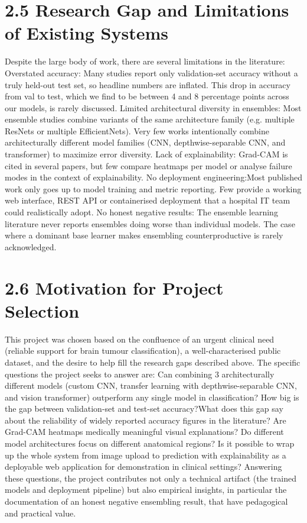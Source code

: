 \documentclass[12pt,a4paper,oneside]{report}
\begin{document}
\section*{2.5 Research Gap and Limitations of Existing Systems}
Despite the large body of work, there are several limitations in the literature:
Overstated accuracy: Many studies report only validation-set accuracy without a truly held-out test set, so headline numbers are inflated. This drop in accuracy from val to test, which we find to be between 4 and 8 percentage points across our models, is rarely discussed.
Limited architectural diversity in ensembles: Most ensemble studies combine variants of the same architecture family (e.g. multiple ResNets or multiple EfficientNets). Very few works intentionally combine architecturally different model families (CNN, depthwise-separable CNN, and transformer) to maximize error diversity.
Lack of explainability: Grad-CAM is cited in several papers, but few compare heatmaps per model or analyse failure modes in the context of explainability. 
No deployment engineering:Most published work only goes up to model training and metric reporting. Few provide a working web interface, REST API or containerised deployment that a hospital IT team could realistically adopt.
No honest negative results:  The ensemble learning literature never reports ensembles doing worse than individual models. The case where a dominant base learner makes ensembling counterproductive is rarely acknowledged.
\section*{2.6 Motivation for Project Selection}
This project was chosen based on the confluence of an urgent clinical need (reliable support for brain tumour classification), a well-characterised public dataset, and the desire to help fill the research gaps described above. The specific questions the project seeks to answer are:
Can combining 3 architecturally different models (custom CNN, transfer learning with depthwise-separable CNN, and vision transformer) outperform any single model in classification?
How big is the gap between validation-set and test-set accuracy?What does this gap say about the reliability of widely reported accuracy figures in the literature?
Are Grad-CAM heatmaps medically meaningful visual explanations? Do different model architectures focus on different anatomical regions?
Is it possible to wrap up the whole system from image upload to prediction with explainability as a deployable web application for demonstration in clinical settings?
Answering these questions, the project contributes not only a technical artifact (the trained models and deployment pipeline) but also empirical insights, in particular the documentation of an honest negative ensembling result, that have pedagogical and practical value.
\end{document}
